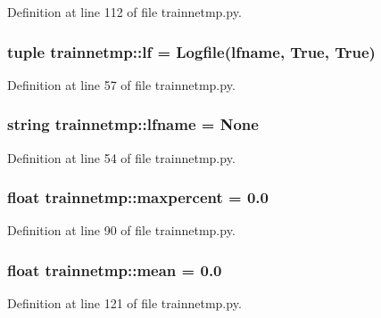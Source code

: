 Definition at line 112 of file trainnetmp.py.

\hypertarget{namespacetrainnetmp_ac6c0cf0d61312a5dbd34443a74310689}{
\subsubsection[{lf}]{\setlength{\rightskip}{0pt plus 5cm}tuple {\bf trainnetmp::lf} = Logfile({\bf lfname}, True, True)}}
\label{namespacetrainnetmp_ac6c0cf0d61312a5dbd34443a74310689}


Definition at line 57 of file trainnetmp.py.

\hypertarget{namespacetrainnetmp_a9ebecee08a7b0aefef2e0b192e970bda}{
\subsubsection[{lfname}]{\setlength{\rightskip}{0pt plus 5cm}string {\bf trainnetmp::lfname} = None}}
\label{namespacetrainnetmp_a9ebecee08a7b0aefef2e0b192e970bda}


Definition at line 54 of file trainnetmp.py.

\hypertarget{namespacetrainnetmp_ae484804d6f3c2525ab89fc23b715d8d0}{
\subsubsection[{maxpercent}]{\setlength{\rightskip}{0pt plus 5cm}float {\bf trainnetmp::maxpercent} = 0.0}}
\label{namespacetrainnetmp_ae484804d6f3c2525ab89fc23b715d8d0}


Definition at line 90 of file trainnetmp.py.

\hypertarget{namespacetrainnetmp_a8647e1123b531e4df1080e929f352389}{
\subsubsection[{mean}]{\setlength{\rightskip}{0pt plus 5cm}float {\bf trainnetmp::mean} = 0.0}}
\label{namespacetrainnetmp_a8647e1123b531e4df1080e929f352389}


Definition at line 121 of file trainnetmp.py.

